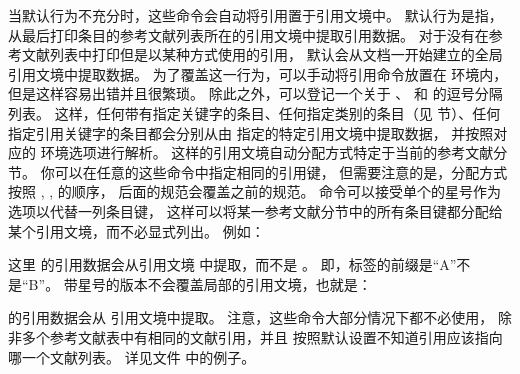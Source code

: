 当默认行为不充分时，这些命令会自动将引用置于引用文境中。
默认行为是指，从最后打印条目的参考文献列表所在的引用文境中提取引用数据。
对于没有在参考文献列表中打印但是以某种方式使用的引用，
默认会从文档一开始建立的全局引用文境中提取数据。
为了覆盖这一行为，可以手动将引用命令放置在  环境内，
但是这样容易出错并且很繁琐。
除此之外，可以登记一个关于 、 和  的逗号分隔列表。
这样，任何带有指定关键字的条目、任何指定类别的条目（见  节）、任何指定引用关键字的条目都会分别从由  指定的特定引用文境中提取数据，
并按照对应的  环境选项进行解析。
这样的引用文境自动分配方式特定于当前的参考文献分节。
你可以在任意的这些命令中指定相同的引用键，
但需要注意的是，分配方式按照 , ,  的顺序，
后面的规范会覆盖之前的规范。
 命令可以接受单个的星号作为选项以代替一列条目键，
这样可以将某一参考文献分节中的所有条目键都分配给某个引用文境，而不必显式列出。
例如：

\begin{ltxexample}[style=latex]{}
\cite{key1}
\begin{refcontext}[labelprefix=B]
\cite{key2}
\end{refcontext}
\end{ltxexample}
%
这里  的引用数据会从引用文境  中提取，而不是 。
即，标签的前缀是“A”不是“B”。
带星号的版本不会覆盖局部的引用文境，也就是：

\begin{ltxexample}[style=latex]{}
\cite{key1}
\begin{refcontext}[labelprefix=B]
\cite{key2}
\end{refcontext}
\end{ltxexample}
%
 的引用数据会从  引用文境中提取。
注意，这些命令大部分情况下都不必使用，
除非多个参考文献表中有相同的文献引用，并且 \biblatex 按照默认设置不知道引用应该指向哪一个文献列表。
详见文件  中的例子。

